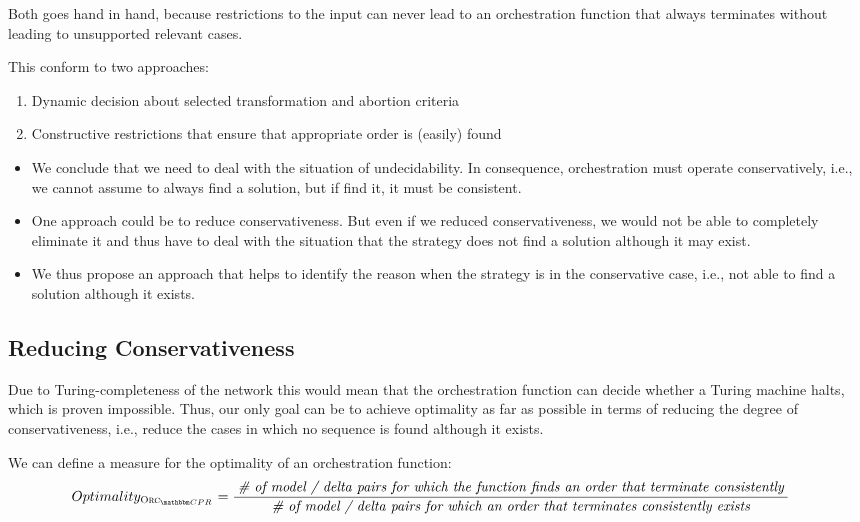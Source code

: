 Both goes hand in hand, because restrictions to the input can never lead to an orchestration function that always terminates without leading to unsupported relevant cases.

This conform to two approaches:
\begin{enumerate}
    \item Dynamic decision about selected transformation and abortion criteria
    \item Constructive restrictions that ensure that appropriate order is (easily) found
\end{enumerate}


\begin{itemize}
    \item We conclude that we need to deal with the situation of undecidability. In consequence, orchestration must operate conservatively, i.e., we cannot assume to always find a solution, but if find it, it must be consistent.
    \item One approach could be to reduce conservativeness. But even if we reduced conservativeness, we would not be able to completely eliminate it and thus have to deal with the situation that the strategy does not find a solution although it may exist.
    \item We thus propose an approach that helps to identify the reason when the strategy is in the conservative case, i.e., not able to find a solution although it exists.
\end{itemize}


\subsection{Reducing Conservativeness}

Due to Turing-completeness of the network this would mean that the orchestration function can decide whether a Turing machine halts, which is proven impossible.
Thus, our only goal can be to achieve optimality as far as possible in terms of reducing the degree of conservativeness, i.e., reduce the cases in which no sequence is found although it exists.

We can define a measure for the optimality of an orchestration function:
\begin{align*}
    &
    Optimality_{\orcfunction{\consistencypreservationruleset{}}} = \frac{\mathtext{\# of model / delta pairs for which the function finds an order that terminate consistently}}{\mathtext{\# of model / delta pairs for which an order that terminates consistently exists}}
\end{align*}

